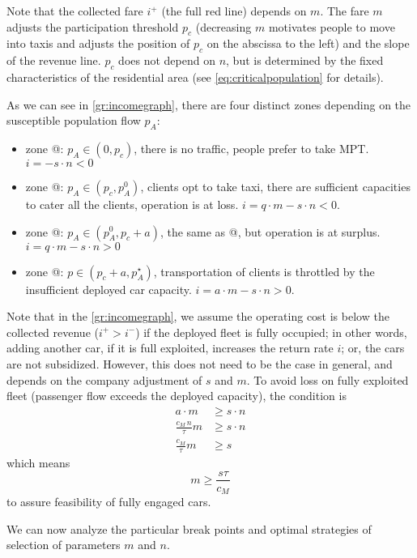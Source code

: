\documentclass[a4paper]{report}
\makeatletter
\newcommand*{\rom}[1]{\expandafter\@slowromancap\romannumeral #1@}
\makeatother
\begin{document}
Note that the collected fare $i^+$ (the full red line) depends on $m$. The fare $m$ adjusts the participation threshold $p_c$ (decreasing $m$ motivates people to move into taxis and adjusts the position of $p_c$ on the abscissa to the left) and the slope of the revenue line. $p_c$ does not depend on $n$, but is determined by the fixed characteristics of the residential area (see \autoref{eq:criticalpopulation} for details).%

As we can see in \autoref{gr:incomegraph}, there are four distinct zones depending on the susceptible population flow $p_A$:
\begin{itemize}
	\item zone \rom{1}: $p_A \in (0,p_c)$, there is no traffic, people prefer to take MPT. $i=-s\cdot n<0$
	\item zone \rom{2}: $p_A \in (p_c, p_A^0)$, clients opt to take taxi, there are sufficient capacities to cater all the clients, operation is at loss. $i=q\cdot m -s\cdot n<0$.
	\item zone \rom{3}: $p_A \in (p_A^0, p_c+a)$,  the same as \rom{2}, but operation is at surplus. $i=q\cdot m-s\cdot n>0$
	\item zone \rom{4}: $p\in (p_c+a, p_A^{\star})$, transportation of clients is throttled by the insufficient deployed car capacity. $i=a\cdot m-s\cdot n>0$.
\end{itemize}

Note that in the \autoref{gr:incomegraph}, we assume the operating cost is below the collected revenue ($i^+>i^-$) if the deployed fleet is fully occupied; in other words, adding another car, if it is full exploited, increases the return rate $i$; or, the cars are not subsidized. However, this does not need to be the case in general, and depends on the company adjustment of $s$ and $m$. To avoid loss on fully exploited fleet (passenger flow exceeds the deployed capacity), the condition is
\begin{align*}
	a\cdot m &\geq s\cdot n\\
	\frac{c_M\, n}{\tau}m &\geq s\cdot n\\
	\frac{c_M}{\tau}m &\geq s
\end{align*}
which means
\begin{equation}
	m\geq\frac{s\tau}{c_M}	\label{eq:feasiblerate}
\end{equation}
to assure feasibility of fully engaged cars.

We can now analyze the particular break points and optimal strategies of selection of parameters $m$ and $n$.%
\end{document}

